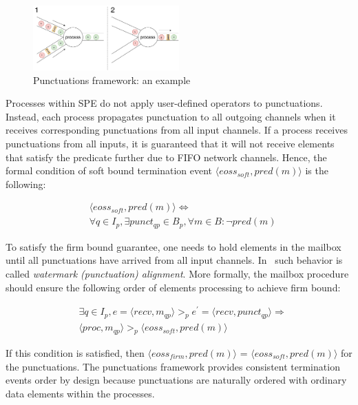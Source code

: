 \begin{figure}[htbp]
  \centering
  \includegraphics[width=0.50\textwidth]{pics/punctuations-scheme.pdf}
  \caption{Punctuations framework: an example}
  \label{punctuations_scheme}
\end{figure}

Processes within SPE do not apply user-defined operators to punctuations. Instead, each process propagates punctuation to all outgoing channels when it receives corresponding punctuations from all input channels. If a process receives punctuations from all inputs, it is guaranteed that it will not receive elements that satisfy the predicate further due to FIFO network channels. Hence, the formal condition of soft bound termination event $\langle eoss_{soft}, pred(m)\rangle$ is the following:

\begin{align*}
& \langle eoss_{soft}, pred(m)\rangle \Longleftrightarrow \\ 
& \forall q \in I_p, \exists punct_{qp} \in B_p, \forall m\in B : \neg pred(m)
\end{align*}

To satisfy the firm bound guarantee, one needs to hold elements in the mailbox until all punctuations have arrived from all input channels. In~\cite{Carbone:2017:SMA:3137765.3137777} such behavior is called {\em watermark (punctuation) alignment}. More formally, the mailbox procedure should ensure the following order of elements processing to achieve firm bound:

\begin{align*}
& \exists q \in I_p, e = \langle recv,m_{qp} \rangle >_p e^{'} = \langle recv,punct_{qp}\rangle \Longrightarrow \\ 
& \langle proc, m_{qp}\rangle >_p \langle eoss_{soft}, pred(m)\rangle
\end{align*}

If this condition is satisfied, then $\langle eoss_{firm}, pred(m)\rangle$ = $\langle eoss_{soft}, pred(m)\rangle$ for the punctuations. The punctuations framework provides consistent termination events order by design because punctuations are naturally ordered with ordinary data elements within the processes.

